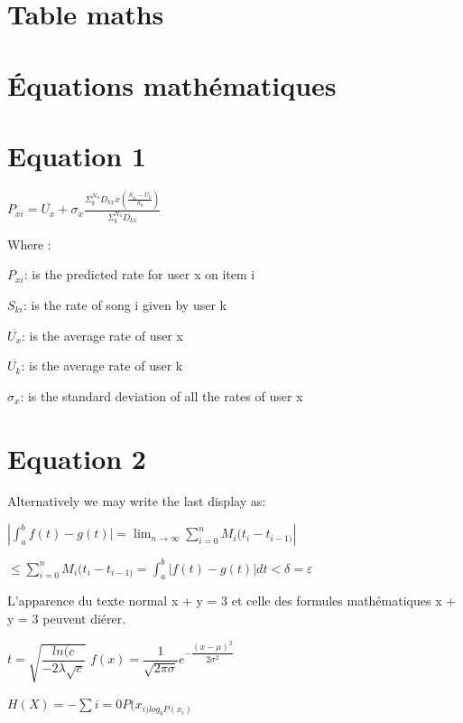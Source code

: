 \documentclass{article}
\begin{document}
\section{Table maths}
\section{Équations mathématiques}
\section*{Equation 1}
\begin{center}
$ P_{xi} = \overline{U_{x}}+\sigma_{x}\frac{\Sigma^{N_{u}}_{k}D_{kx} x (\frac{S_{ki}-\overline{U_{k}}}{\sigma_{k}})}{\Sigma^{N_{u}}_{k}D_{kx}} $
\end{center}
Where : \newline

$P_{xi}$: is the predicted rate for user x on item i \newline

$S_{ki}$: is the rate of song i given by user k \newline

$\overline{U_{x}}$: is the average rate of user x \newline

$\overline{U_{k}}$: is the average rate of user k \newline

$\sigma_{x}$: is the standard deviation of all the rates of user x
\newpage
\section*{Equation 2}
Alternatively we may write the last display as: \newline

$\displaystyle\left\lvert \int^{b}_{a} f(t) - g(t)\vert =  \lim_{n \to \infty} \sum_{i = 0}^{n} M_{i}(t_{i}-t_{i-1)} \right\rvert$
\begin{center}
$\leq \sum_{i = 0}^{n} M_{i}(t_{i}-t_{i-1)} = \int^{b}_{a} \lvert f(t) - g(t)\rvert dt < \delta = \varepsilon  $
\end{center}
L'apparence du texte normal x + y = 3 et celle des
formules mathématiques x + y = 3 peuvent diérer.
\begin{center}
$ t = \sqrt{\dfrac{ln(c}{-2\lambda\sqrt{c}}} $ \qquad  $ f(x) = \dfrac{1}{\sqrt{2\pi\sigma}}  {e^{-\dfrac{(x-\mu)^{2}}{2\sigma^{2}}}}$ \newline

$ H(X) = -\sum{i = 0}P(x_{i)log_{b}P(x_{i})} $
\end{center}
\end{document}
